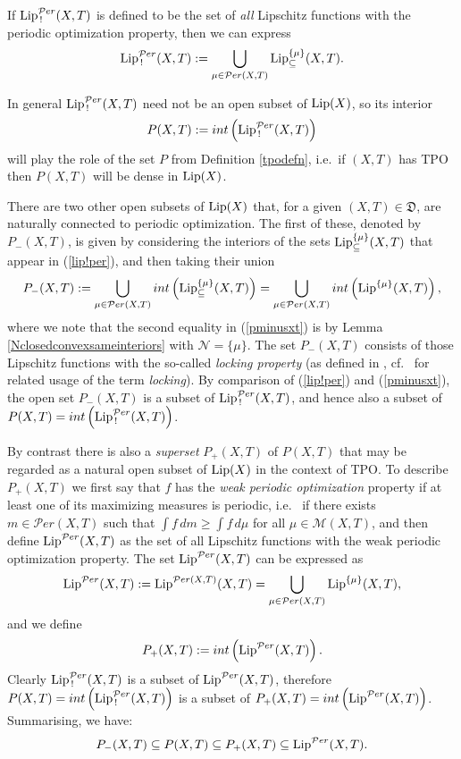 \documentclass[reqno,11pt]{amsart}
\theoremstyle{definition}
\theoremstyle{remark}
\theoremstyle{remark}
\def\m{\mathcal M}
\def\n{\mathcal N}
\def\per{{\mathcal{P}er}}
\def\lip{{\rm Lip}}
\def\D{\mathfrak{D}}
\numberwithin{equation}{section}
\begin{document}
If $\lip^\per_{\, !}(X,T)$ is defined to be the set of \emph{all} Lipschitz functions with 
the periodic optimization property, then we can express
\begin{equation}\label{lip!per}
\lip^\per_{\, !}(X,T) := \bigcup_{\mu\in\per(X,T)} \lip^{\{\mu\}}_\subseteq(X,T).
\end{equation}

In general $\lip^\per_{\, !}(X,T)$ need not be an open subset of $\lip(X)$, so its interior
$$
P(X,T):= int\left(  \lip^\per_{\, !}(X,T) \right)
$$
will play the role of the set $P$ from Definition \ref{tpodefn}, i.e.~if $(X,T)$ has TPO
then $P(X,T)$ will be dense in $\lip(X)$.

There are two other open subsets of $\lip(X)$ that, for a given $(X,T)\in\D$, are naturally connected to periodic optimization.
The first of these, denoted by $P_{-}(X,T)$, is given by considering the interiors
of the sets $\lip^{\{\mu\}}_\subseteq(X,T)$ that appear
in (\ref{lip!per}), and then taking their union
\begin{equation}\label{pminusxt}
P_{-}(X,T):= \bigcup_{\mu\in\per(X,T)}  int\left( \lip^{\{\mu\}}_\subseteq(X,T)\right)
= \bigcup_{\mu\in\per(X,T)}  int\left( \lip^{\{\mu\}}(X,T)\right),
\end{equation}
where we note that the second equality in (\ref{pminusxt})
is by Lemma \ref{Nclosedconvexsameinteriors}
with $\n=\{\mu\}$.
The set $P_-(X,T)$ consists of those Lipschitz functions with the so-called \emph{locking property}
(as defined in \cite{Boc19, BZ15}, cf.~\cite{B00, Jen00} for related usage of the term \emph{locking}).
By comparison of (\ref{lip!per}) and (\ref{pminusxt}), the open set $P_{-}(X,T)$ is a subset of  $\lip^\per_{\, !}(X,T)$,
and hence also a subset of $P(X,T)=  int\left(  \lip^\per_{\, !}(X,T) \right)$.

By contrast there is also a \emph{superset} $P_+(X,T)$ of $P(X,T)$ that may be regarded as a natural open subset of $\lip(X)$ in the context of TPO. To describe $P_+(X,T)$ we first say that $f$ has the \emph{weak periodic optimization} property if at least one of its maximizing measures is periodic, i.e.~ if there exists $m\in\per(X,T)$ such that 
$\int f\, dm \ge \int f\, d\mu$ for all $\mu\in\m(X,T)$, and then define
$\lip^\per(X,T)$ as the set of all Lipschitz functions with the weak periodic optimization property.
The set $\lip^\per(X,T)$ can be expressed as
\begin{equation}\label{lipperexpression}
\lip^\per(X,T):=\lip^{\per(X,T)}(X,T) =  \bigcup_{\mu\in\per(X,T)} \lip^{\{\mu\}}(X,T),
\end{equation}
and we define
$$
P_+(X,T):= int\left( \lip^\per(X,T) \right).
$$
Clearly $\lip^\per_{\, !}(X,T)$ is a subset of $\lip^\per(X,T)$,
therefore
$P(X,T)= int\left(  \lip^\per_{\, !}(X,T) \right)$
is a subset of
$P_+(X,T)= int\left( \lip^\per(X,T) \right)$. Summarising, we have:
\begin{equation}\label{containmentp}
P_-(X,T) \subseteq P(X,T) \subseteq P_+(X,T) \subseteq \lip^\per(X,T).
\end{equation}
\end{document}
